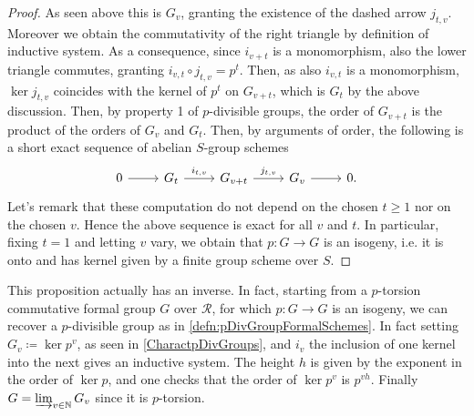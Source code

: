 \begin{proof}
	As seen above this is $G_v$, granting the existence of the 
	dashed arrow $j_{t,v}$.
	Moreover we obtain the commutativity of the right triangle by
	definition of inductive system.
	As a consequence, since $i_{v+t}$ is a monomorphism,
	also the lower triangle commutes, granting
	$i_{v,t} \circ j_{t,v} = p^t$.
	Then, as also $i_{v,t}$ is a monomorphism, $\ker j_{t,v}$
	coincides with the kernel of $p^t$ on $G_{v+t}$, 
	which is $G_t$ by the above discussion.
	Then, by property 1 of $p$-divisible groups,
	the order of $G_{v+t}$ is the product of the orders
	of $G_v$ and $G_t$. Then, by arguments of order, the following is a
	short exact sequence of abelian $S$-group schemes
	\begin{equation}\label{eqn:pDivGrInducedmultiplication}
	\begin{tikzcd}
		0 \arrow[r, "", rightarrow] &
		G_t \arrow[r, "i_{t,v}", rightarrow] &
		G_{v+t} \arrow[r, "j_{t,v}", rightarrow] &
		G_v \arrow[r, "", rightarrow] &
		0
	.\end{tikzcd}
	\end{equation}
	Let's remark that these computation do not depend on the chosen $t \geq 1$
	nor on the chosen $v$.
	Hence the above sequence is exact for all $v$ and $t$.
	In particular, fixing $t=1$ and letting $v$ vary,
	we obtain that $p\colon G \to G$ is an isogeny,
	i.e. it is onto and has kernel given by a finite group scheme over $S$.
\end{proof}


\begin{rem}[]
	This proposition actually has an inverse.
	In fact, starting from a $p$-torsion commutative formal group $G$ over
	$\mathscr{R}$, for which $p\colon G \to G$ is an isogeny, we can recover a $p$-divisible
	group as in \cref{defn:pDivGroupFormalSchemes}.
	In fact setting $G_v \coloneqq \ker p^v$, as seen in \cref{CharactpDivGroups},
	and $i_v$ the inclusion of one kernel into the next gives an inductive system.
	The height $h$ is given by the exponent in the order of $\ker p$,
	and one checks that the order of $\ker p^v$ is $p^{vh}$.
	Finally $G = \varinjlim_{v \in \mathbb{N}} G_v$ since it is $p$-torsion.
\end{rem}



